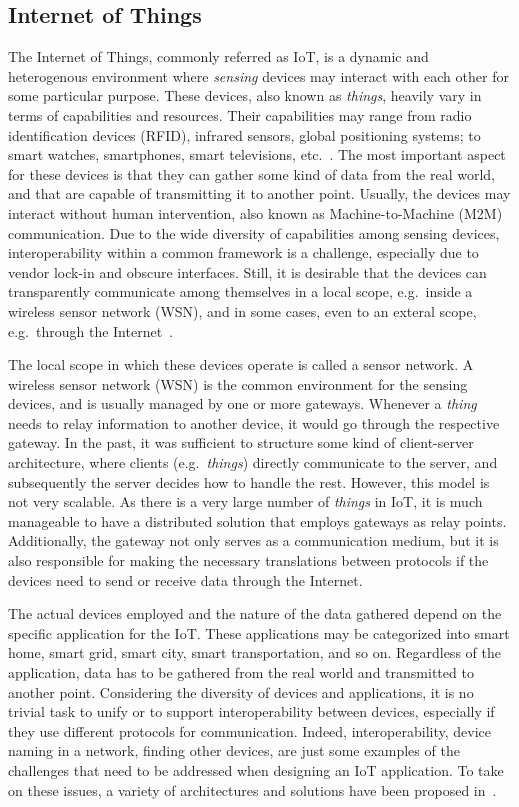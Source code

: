 \documentclass[12pt]{article}
\begin{document}
\subsection{Internet of Things}
\label{ssec:iot}
The Internet of Things, commonly referred as IoT, is a dynamic and heterogenous environment where \emph{sensing} devices may interact with each other for some particular purpose. These devices, also known as \emph{things}, heavily vary in terms of capabilities and resources. Their capabilities may range from radio identification devices (RFID), infrared sensors, global positioning systems; to smart watches, smartphones, smart televisions, etc.~\cite{ALABA201710}. The most important aspect for these devices is that they can gather some kind of data from the real world, and that are capable of transmitting it to another point. Usually, the devices may interact without human intervention, also known as Machine-to-Machine (M2M) communication. Due to the wide diversity of capabilities among sensing devices, interoperability within a common framework is a challenge, especially due to vendor lock-in and obscure interfaces. Still, it is desirable that the devices can transparently communicate among themselves in a local scope, e.g.\ inside a wireless sensor network (WSN), and in some cases, even to an exteral scope, e.g.\ through the Internet~\cite{Zhang:2015}.

The local scope in which these devices operate is called a sensor network. A wireless sensor network (WSN) is the common environment for the sensing devices, and is usually managed by one or more gateways. Whenever a \emph{thing} needs to relay information to another device, it would go through the respective gateway. In the past, it was sufficient to structure some kind of client-server architecture, where clients (e.g.\ \emph{things}) directly communicate to the server, and subsequently the server decides how to handle the rest. However, this model is not very scalable. As there is a very large number of \emph{things} in IoT, it is much manageable to have a distributed solution that employs gateways as relay points. Additionally, the gateway not only serves as a communication medium, but it is also responsible for making the necessary translations between protocols if the devices need to send or receive data through the Internet.

The actual devices employed and the nature of the data gathered depend on the specific application for the IoT. These applications may be categorized into smart home, smart grid, smart city, smart transportation, and so on. Regardless of the application, data has to be gathered from the real world and transmitted to another point. Considering the diversity of devices and applications, it is no trivial task to unify or to support interoperability between devices, especially if they use different protocols for communication. Indeed, interoperability, device naming in a network, finding other devices, are just some examples of the challenges that need to be addressed when designing an IoT application. To take on these issues, a variety of architectures and solutions have been proposed in~\cite{ALABA201710}. 
\end{document}
